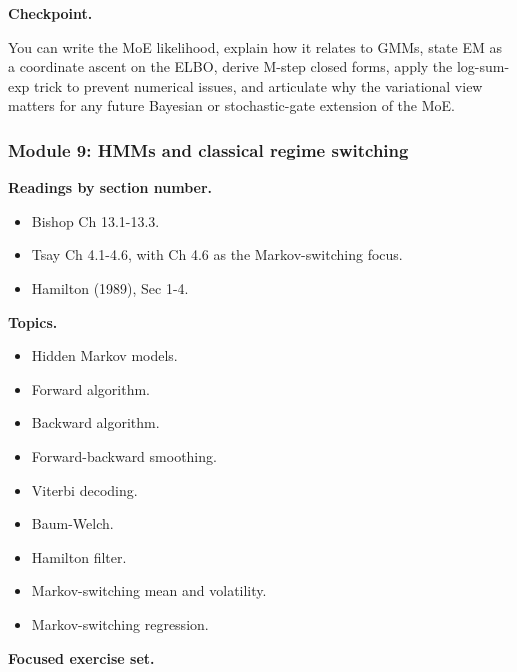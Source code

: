 \textbf{Checkpoint.}

You can write the MoE likelihood, explain how it relates to GMMs, state
EM as a coordinate ascent on the ELBO, derive M-step closed forms, apply
the log-sum-exp trick to prevent numerical issues, and articulate why
the variational view matters for any future Bayesian or stochastic-gate
extension of the MoE.

\subsubsection{Module 9: HMMs and classical regime
switching}\label{module-9-hmms-and-classical-regime-switching}

\textbf{Readings by section number.}

\begin{itemize}
\tightlist
\item
  Bishop Ch 13.1-13.3.
\item
  Tsay Ch 4.1-4.6, with Ch 4.6 as the Markov-switching focus.
\item
  Hamilton (1989), Sec 1-4.
\end{itemize}

\textbf{Topics.}

\begin{itemize}
\tightlist
\item
  Hidden Markov models.
\item
  Forward algorithm.
\item
  Backward algorithm.
\item
  Forward-backward smoothing.
\item
  Viterbi decoding.
\item
  Baum-Welch.
\item
  Hamilton filter.
\item
  Markov-switching mean and volatility.
\item
  Markov-switching regression.
\end{itemize}

\textbf{Focused exercise set.}

